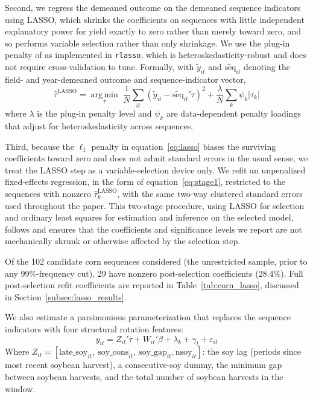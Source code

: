 \documentclass[12pt,letterpaper]{article}
\theoremstyle{remark}
\theoremstyle{remark}
\theoremstyle{plain}
\theoremstyle{definition}
\begin{document}
Second, we regress the demeaned outcome on the demeaned sequence indicators using LASSO, which shrinks the coefficients on sequences with little independent explanatory power for yield exactly to zero rather than merely toward zero, and so performs variable selection rather than only shrinkage. We use the plug-in penalty of \citet{Belloni2014} as implemented in \texttt{rlasso}, which is heteroskedasticity-robust and does not require cross-validation to tune. Formally, with $\tilde{y}_{it}$ and $\tilde{\text{seq}}_{it}$ denoting the field- and year-demeaned outcome and sequence-indicator vector,
%
\begin{equation}
  \hat{\tau}^{\text{LASSO}} = \operatorname*{arg\,min}_{\tau} \; \frac{1}{N}\sum_{it}\left(\tilde{y}_{it} - \tilde{\text{seq}}_{it}'\tau\right)^2 + \frac{\lambda}{N}\sum_{k}\psi_k|\tau_k|
  \label{eq:lasso}
\end{equation}
%
where $\lambda$ is the plug-in penalty level and $\psi_k$ are data-dependent penalty loadings that adjust for heteroskedasticity across sequences.

Third, because the $\ell_1$ penalty in equation~\eqref{eq:lasso} biases the surviving coefficients toward zero and does not admit standard errors in the usual sense, we treat the LASSO step as a variable-selection device only. We refit an unpenalized fixed-effects regression, in the form of equation~\eqref{eq:stage1}, restricted to the sequences with nonzero $\hat{\tau}^{\text{LASSO}}_k$, with the same two-way clustered standard errors used throughout the paper. This two-stage procedure, using LASSO for selection and ordinary least squares for estimation and inference on the selected model, follows \citet{Belloni2014} and ensures that the coefficients and significance levels we report are not mechanically shrunk or otherwise affected by the selection step.

Of the 102 candidate corn sequences considered (the unrestricted sample, prior to any 99\%-frequency cut), 29 have nonzero post-selection coefficients (28.4\%). Full post-selection refit coefficients are reported in Table~\ref{tab:corn_lasso}, discussed in Section~\ref{subsec:lasso_results}.


We also estimate a parsimonious parameterization that replaces the sequence indicators with four structural rotation features:
%
\begin{equation}
  y_{it} = Z_{it}'\tau + W_{it}'\beta + \lambda_k + \gamma_t + \varepsilon_{it}
  \label{eq:zvector}
\end{equation}
%
 Where $Z_{it} = [\text{late\_soy}_{it},\ \text{soy\_cons}_{it},\ \text{soy\_gap}_{it},\text{nsoy}_{it}]$: the soy lag (periods since most recent soybean harvest), a consecutive-soy dummy, the minimum gap between soybean harvests, and the total number of soybean harvests in the window.
 
\end{document}
